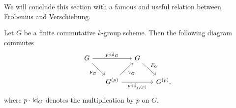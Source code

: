 \noindent
We will conclude this section with a famous and useful relation between
Frobenius and Verschiebung.
\begin{thm}\label{thm:FrobeniusVerschiebungRelation}
	Let $G$ be a finite commutative $k$-group scheme. Then the following
	diagram commutes
	\begin{equation*}
	\begin{tikzcd}[column sep=1.5em]
		G \arrow[rr, "p \cdot \id_{ G }", rightarrow] 
		\arrow[rd, "F_G"', rightarrow] & &
		G \arrow[rd, "F_G", rightarrow] & \\
		&
		G^{(p)} \arrow[ru, "V_G"', rightarrow] 
		\arrow[rr, "p \cdot \id_{ G^{(p)} }"', rightarrow] & &
		G^{(p)}
	,\end{tikzcd}
	\end{equation*}
	where $p \cdot \operatorname{id}_{ G }$ denotes the multiplication by $p$
	on $G$.
\end{thm}


